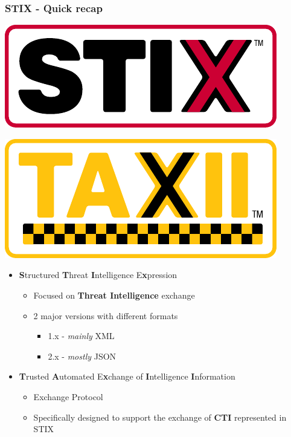 \begin{frame}
    \frametitle{STIX - Quick recap}
    \begin{minipage}{0.5\textwidth}
        \centering
        \includegraphics[scale=0.5]{images/LOGO_STIX.pdf}
    \end{minipage}%
    \begin{minipage}{0.5\textwidth}
        \centering
        \includegraphics[scale=0.45]{images/LOGO_TAXII.pdf}
    \end{minipage}
    \vspace{1em}
    \begin{itemize}
        \item \textbf{S}tructured \textbf{T}hreat \textbf{I}ntelligence E\textbf{x}pression
        \begin{itemize}
            \item Focused on \textbf{Threat Intelligence} exchange
            \item 2 major versions with different formats
            \begin{itemize}
                \item 1.x - \emph{mainly} XML
                \item 2.x - \emph{mostly} JSON
            \end{itemize}
        \end{itemize}
        \item \textbf{T}rusted \textbf{A}utomated E\textbf{x}change of \textbf{I}ntelligence \textbf{I}nformation
        \begin{itemize}
            \item Exchange Protocol
            \item Specifically designed to support the exchange of \textbf{CTI} represented in STIX
        \end{itemize}
    \end{itemize}
\end{frame}

